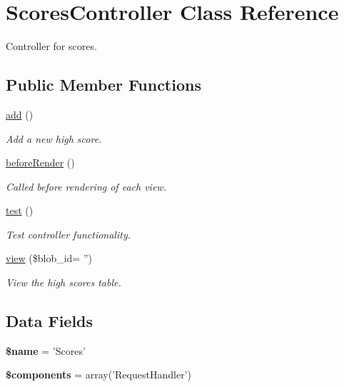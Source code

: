 \hypertarget{class_scores_controller}{
\section{ScoresController Class Reference}
\label{class_scores_controller}
}


Controller for scores.  


\subsection*{Public Member Functions}
\begin{DoxyCompactItemize}
\item 
\hyperlink{class_scores_controller_a837ba24a1c3095ae67613238d866f79a}{add} ()
\begin{DoxyCompactList}\small\item\em Add a new high score. \item\end{DoxyCompactList}\item 
\hyperlink{class_scores_controller_ac89dd29d2229bbc37879d31f95d06e97}{beforeRender} ()
\begin{DoxyCompactList}\small\item\em Called before rendering of each view. \item\end{DoxyCompactList}\item 
\hypertarget{class_scores_controller_ad69dd4607977cae05ebe19d1ae604fb1}{
\hyperlink{class_scores_controller_ad69dd4607977cae05ebe19d1ae604fb1}{test} ()}
\label{class_scores_controller_ad69dd4607977cae05ebe19d1ae604fb1}

\begin{DoxyCompactList}\small\item\em Test controller functionality. \item\end{DoxyCompactList}\item 
\hyperlink{class_scores_controller_a82afb1e6c361be60e0ec7e239ea40a93}{view} (\$blob\_\-id= '')
\begin{DoxyCompactList}\small\item\em View the high scores table. \item\end{DoxyCompactList}\end{DoxyCompactItemize}
\subsection*{Data Fields}
\begin{DoxyCompactItemize}
\item 
\hypertarget{class_scores_controller_ab2fc40d43824ea3e1ce5d86dee0d763b}{
{\bfseries \$name} = 'Scores'}
\label{class_scores_controller_ab2fc40d43824ea3e1ce5d86dee0d763b}

\item 
\hypertarget{class_scores_controller_a2409c247baf67a1d4c6b9a1789cfc088}{
{\bfseries \$components} = array('RequestHandler')}
\label{class_scores_controller_a2409c247baf67a1d4c6b9a1789cfc088}

\end{DoxyCompactItemize}


